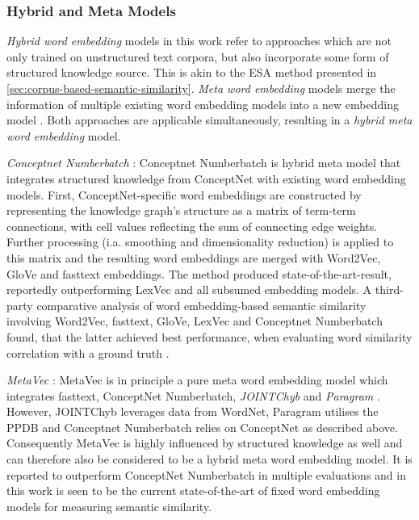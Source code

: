 \documentclass[11pt, numbers=noenddot]{scrreprt}
\let\cite\parencite  %
\begin{document}
\subsubsection{Hybrid and Meta Models}
\textit{Hybrid word embedding} models in this work refer to approaches which are not only trained on unstructured text corpora, but also incorporate some form of structured knowledge source. This is akin to the ESA method presented in \cref{sec:corpus-based-semantic-similarity}. \textit{Meta word embedding} models merge the information of multiple existing word embedding models into a new embedding model \cite{bollegalaSurveyWordMetaEmbedding2022}. Both approaches are applicable simultaneously, resulting in a \textit{hybrid meta word embedding} model.


\textit{Conceptnet Numberbatch} \cite{speerConceptNetOpenMultilingual2018, speerConceptNetOpenMultilingual2017}: Conceptnet Numberbatch is hybrid meta model that integrates structured knowledge from ConceptNet with existing word embedding models. First, ConceptNet-specific word embeddings are constructed by representing the knowledge graph's structure as a matrix of term-term connections, with cell values reflecting the sum of connecting edge weights. Further processing (i.a. smoothing and dimensionality reduction) is applied to this matrix and the resulting word embeddings are merged with Word2Vec, GloVe and fasttext embeddings. The method produced state-of-the-art-result, reportedly outperforming LexVec and all subsumed embedding models. A third-party comparative analysis of word embedding-based semantic similarity involving Word2Vec, fasttext, GloVe, LexVec and Conceptnet Numberbatch found, that the latter achieved best performance, when evaluating word similarity correlation with a ground truth \cite{toshevskaComparativeAnalysisWord2020}.

\textit{MetaVec} \cite{garcia-ferreroBenchmarkingMetaembeddingsWhat2021}: MetaVec is in principle a pure meta word embedding model which integrates fasttext, ConceptNet Numberbatch, \textit{JOINTChyb} \cite{goikoetxeaBilingualEmbeddingsRandom2018a} and \textit{Paragram} \cite{wietingParaphraseDatabaseCompositional2015a}. However, JOINTChyb leverages data from WordNet, Paragram utilises the PPDB and Conceptnet Numberbatch relies on ConceptNet as described above. Consequently MetaVec is highly influenced by structured knowledge as well and can therefore also be considered to be a hybrid meta word embedding model. It is reported to outperform ConceptNet Numberbatch in multiple evaluations and in this work is seen to be the current state-of-the-art of fixed word embedding models for measuring semantic similarity.
\end{document}
